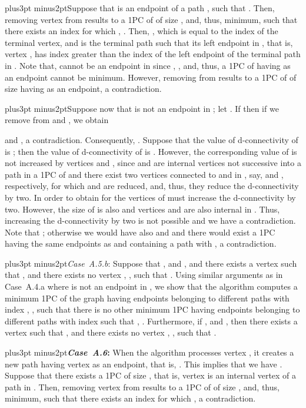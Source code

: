 \documentclass[10pt]{article}
\def\yskip{\penalty-50\vskip3pt plus3pt minus2pt}
\def\y{\yskip}
\begin{document}
{\y Suppose that  is an endpoint of a path , such that
. Then, removing vertex  from
 results to a 1PC of  of size
, and, thus, minimum, such that there
exists an index  for which , . Then, , which is equal to the index of the terminal
vertex, and  is the terminal path such that its left endpoint
in , that is, vertex ,
has index greater than the index of the left endpoint of the
terminal path in . Note that,
 cannot be an endpoint in
 since , , and, thus, a 1PC
of  having  as an endpoint cannot be minimum.
However, removing  from 
results to a 1PC of  of size 
having  as an endpoint, a contradiction.

\y Suppose now that  is not an endpoint in
; let . If  then if we remove
 from  and
, we obtain

and , a
contradiction. Consequently, . Suppose
that the value of d-connectivity of
 is ; then the value of
d-connectivity of  is .
However, the corresponding value of
 is not increased by vertices
 and , since  and  are
internal vertices not successive into a path in a 1PC of 
and there exist two vertices connected to  and  in
, say,  and ,
respectively, for which  and  are reduced, and,
thus, they reduce the d-connectivity by two. In order to obtain
 for  the vertices of
 must increase the d-connectivity by
two. However, the size of  is also
 and vertices  and 
are also internal in . Thus,
increasing the d-connectivity by two is not possible and we have a
contradiction. Note that ; otherwise we would
have also  and  and there would
exist a 1PC having the same endpoints as
 and containing a path  with , a contradiction.

\y \textit{Case~A.5.b}: Suppose that ,  and
,  and there exists a vertex  such that
, 
and there exists no vertex , , such that
. Using
similar arguments as in Case~A.4.a where  is not an endpoint
in , we show that the algorithm
computes a minimum 1PC  of the graph
 having  endpoints  belonging to
different paths with index , ,
such that there is no other minimum 1PC
 having 
endpoints  belonging to different paths with index
 such that
, .
Furthermore, if ,
 and ,  then there exists a
vertex  such that ,  and there exists no
vertex , , such that
.


\y {\bf \textit{Case~A.6}:} When the algorithm processes vertex
, it creates a new path having vertex  as an endpoint,
that is, .
This implies that  we have
. Suppose that there exists a 1PC
 of size
, that is, vertex  is an
internal vertex of a path  in .
Then, removing vertex  from 
results to a 1PC of  of size ,
and, thus, minimum, such that there exists an index  for which
, a contradiction.

}
\end{document}
